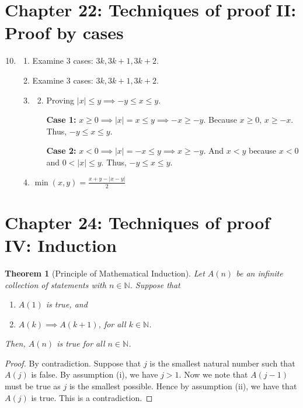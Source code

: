 \documentclass{article}
\newtheorem*{theorem*}{Theorem}
\begin{document}
\section*{Chapter 22: Techniques of proof II: Proof by cases}
\begin{enumerate}[label=22.\arabic*]
    \setcounter{enumi}{9}
  \item
    \begin{enumerate}[label=(\roman*)]
      \item Examine 3 cases: $3k, 3k+1, 3k+2$.
      \item Examine 3 cases: $3k, 3k+1, 3k+2$.
      \item
        \begin{enumerate}[label=(\alph*)]
            \setcounter{enumiii}{1}
          \item Proving $|x| \le y \implies -y \le x \le y$.

            \textbf{Case 1:} $x\ge0\implies|x|=x \le y\implies-x\ge-y$. Because $x\ge0$,
            $x\ge-x$. Thus, $-y \le x \le y$.

            \textbf{Case 2:} $x<0\implies|x|=-x \le y\implies x\ge-y$. And $x<y$ because
            $x<0$ and $0<|x| \le y$. Thus, $-y \le x \le y$.
        \end{enumerate}
        \setcounter{enumii}{6}
      \item $\min(x, y) = \frac{x+y-|x-y|}{2}$
    \end{enumerate}
\end{enumerate}

\section*{Chapter 24: Techniques of proof IV: Induction}
\begin{theorem*}[Principle of Mathematical Induction]
  Let $A(n)$ be an infinite collection of statements with $n\in\mathbb{N}$. Suppose that
  \begin{enumerate}[label=(\roman*)]
    \item $A(1)$ is true, and
    \item $A(k) \implies A(k+1)$, for all $k\in\mathbb{N}$.
  \end{enumerate}
  Then, $A(n)$ is true for all $n\in\mathbb{N}$.
\end{theorem*}
\begin{proof}
  By contradiction. Suppose that $j$ is the smallest natural number such that $A(j)$ is false. By
  assumption (i), we have $j>1$. Now we note that $A(j-1)$ must be true as $j$ is the smallest
  possible. Hence by assumption (ii), we have that $A(j)$ is true. This is a contradiction.
\end{proof}
\end{document}
